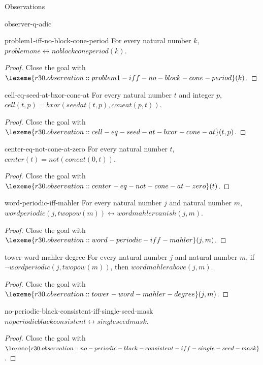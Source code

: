 \begin{lexlean}{Observations}
\begin{section}{observer-q-adic}
\begin{theorem}{problem1-iff-no-block-cone-period}
For every natural number \(k\), \(problemone ↔ noblockconeperiod(k)\).
\begin{proof}
Close the goal with \(\lexeme{r30.observation::problem1-iff-no-block-cone-period}(k)\).
\end{proof}
\end{theorem}

\begin{theorem}{cell-eq-seed-at-bxor-cone-at}
For every natural number \(t\) and integer \(p\), \(cell(t, p) = bxor(seedat(t, p), coneat(p, t))\).
\begin{proof}
Close the goal with \(\lexeme{r30.observation::cell-eq-seed-at-bxor-cone-at}(t, p)\).
\end{proof}
\end{theorem}

\begin{theorem}{center-eq-not-cone-at-zero}
For every natural number \(t\), \(center(t) = not(coneat(0, t))\).
\begin{proof}
Close the goal with \(\lexeme{r30.observation::center-eq-not-cone-at-zero}(t)\).
\end{proof}
\end{theorem}

\begin{theorem}{word-periodic-iff-mahler}
For every natural number \(j\) and natural number \(m\), \(wordperiodic(j, twopow(m)) ↔ wordmahlervanish(j, m)\).
\begin{proof}
Close the goal with \(\lexeme{r30.observation::word-periodic-iff-mahler}(j, m)\).
\end{proof}
\end{theorem}

\begin{theorem}{tower-word-mahler-degree}
For every natural number \(j\) and natural number \(m\), if \(¬ wordperiodic(j, twopow(m))\), then \(wordmahlerabove(j, m)\).
\begin{proof}
Close the goal with \(\lexeme{r30.observation::tower-word-mahler-degree}(j, m)\).
\end{proof}
\end{theorem}

\begin{theorem}{no-periodic-black-consistent-iff-single-seed-mask}
\(noperiodicblackconsistent ↔ singleseedmask\).
\begin{proof}
Close the goal with \(\lexeme{r30.observation::no-periodic-black-consistent-iff-single-seed-mask}\).
\end{proof}
\end{theorem}


\end{section}
\end{lexlean}
